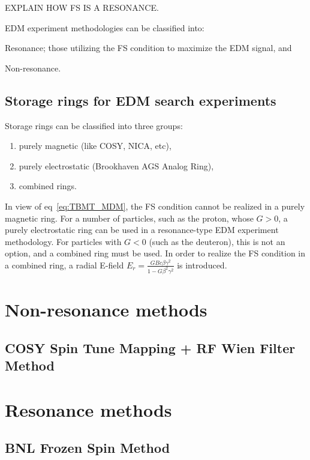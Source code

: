 \documentclass{article}
\begin{document}
EXPLAIN HOW FS IS A RESONANCE.~\cite{COSY:ImperfectionResonance}

EDM experiment methodologies can be classified into:
\begin{inparaenum}[1)]
\item Resonance; those utilizing the FS condition to maximize the EDM signal, and
\item Non-resonance.
\end{inparaenum}

\subsection{Storage rings for EDM search experiments}
Storage rings can be classified into three groups:
\begin{enumerate}
\item purely magnetic (like COSY, NICA, etc),
\item purely electrostatic (Brookhaven AGS Analog Ring),
\item combined rings.
\end{enumerate}

In view of eq~\eqref{eq:TBMT_MDM}, the FS condition cannot be realized in a purely magnetic ring. For a number of particles, such as the proton, whose $G>0$, a purely electrostatic ring can be used in a resonance-type EDM experiment methodology. For particles with $G<0$ (such as the deuteron), this is not an option, and a combined ring must be used. In order to realize the FS condition in a combined ring, a radial E-field $E_r = \frac{GBc\beta\gamma^2}{1-G\beta^2\gamma^2}$ is introduced.~\cite{BNL:Deuteron2008} 

\section{Non-resonance methods}

\subsection{COSY Spin Tune Mapping + RF Wien Filter Method}

\section{Resonance methods}

\subsection{BNL Frozen Spin Method}
\end{document}
